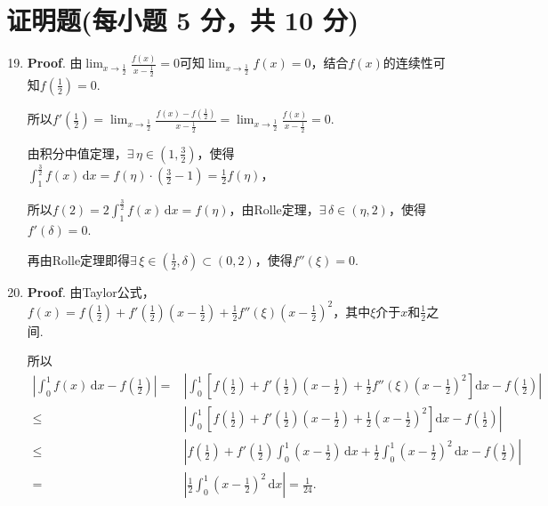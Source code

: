 \documentclass[../Main.tex]{subfiles}
\begin{document}
\section{证明题(每小题 5 分，共 10 分)}
\begin{enumerate}
    \setcounter{enumi}{18}
    \item \textbf{Proof}. 由$\lim_{x\to\frac{1}{2}}\frac{f(x)}{x-\frac{1}{2}}
              =0$可知$\lim_{x\to\frac{1}{2}}f(x)=0$，结合$f(x)$的连续性可知$f\left(\frac{1}{2}
              \right)=0$.

          所以$f'\left(\frac{1}{2}\right)=\lim_{x\to\frac{1}{2}}\frac{f(x)-f\left(\frac{1}{2}\right)}{x-\frac{1}{2}}
              =\lim_{x\to\frac{1}{2}}\frac{f(x)}{x-\frac{1}{2}}=0$.

          由积分中值定理，$\exists\,\eta\in\left(1,\frac{3}{2}\right)$，使得$\int_{1}
              ^{\frac{3}{2}}f(x)\,\mathrm{d}x=f(\eta)\cdot\left(\frac{3}{2}-1\right)=\frac{1}{2}
              f(\eta)$，

          所以$f(2)=2\int_{1}^{\frac{3}{2}}f(x)\,\mathrm{d}x=f(\eta)$，由Rolle定理，$\exists
              \,\delta\in\left(\eta,2\right)$，使得$f'(\delta)=0$.

          再由Rolle定理即得$\exists\,\xi\in\left(\frac{1}{2},\delta\right)\subset(0,2
              )$，使得$f''(\xi)=0$.

    \item \textbf{Proof}. 由Taylor公式，$f(x)=f\left(\frac{1}{2}\right)+f'\left
              (\frac{1}{2}\right)\left(x-\frac{1}{2}\right)+\frac{1}{2}f''(\xi)\left(x-\frac{1}{2}
              \right)^{2}$，其中$\xi$介于$x$和$\frac{1}{2}$之间.

          所以
          \[
              \begin{aligned}
                  \left|\int_{0}^{1}f(x)\,\mathrm{d}x-f\left(\frac{1}{2}\right)\right| = & \left|\int_{0}^{1}\left[f\left(\frac{1}{2}\right)+f'\left(\frac{1}{2}\right)\left(x-\frac{1}{2}\right)+\frac{1}{2}f''(\xi)\left(x-\frac{1}{2}\right)^{2}\right]\mathrm{d}x-f\left(\frac{1}{2}\right)\right|       \\
                  \leq                                                                   & \left|\int_{0}^{1}\left[f\left(\frac{1}{2}\right)+f'\left(\frac{1}{2}\right)\left(x-\frac{1}{2}\right)+\frac{1}{2}\left(x-\frac{1}{2}\right)^{2}\right]\mathrm{d}x-f\left(\frac{1}{2}\right)\right|               \\
                  \leq                                                                   & \left|f\left(\frac{1}{2}\right)+f'\left(\frac{1}{2}\right)\int_{0}^{1}\left(x-\frac{1}{2}\right)\,\mathrm{d}x+\frac{1}{2}\int_{0}^{1}\left(x-\frac{1}{2}\right)^{2}\,\mathrm{d}x-f\left(\frac{1}{2}\right)\right| \\
                  =                                                                      & \left|\frac{1}{2}\int_{0}^{1}\left(x-\frac{1}{2}\right)^{2}\,\mathrm{d}x\right| = \frac{1}{24}.
              \end{aligned}
          \]
\end{enumerate}
\end{document}
